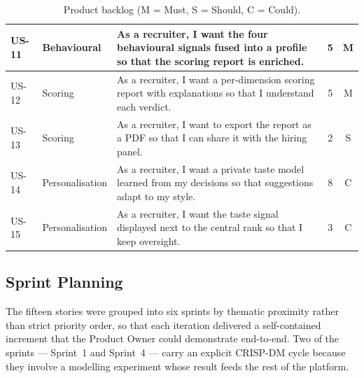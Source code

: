 \begin{table}[!htbp]
{{\begin{tabular}{|l|l|p{9.5cm}|c|c|}
        US-11 & Behavioural  & As a recruiter, I want the four behavioural signals fused into a profile so that the scoring report is enriched.                         & 5 & M \\
        \hline
        US-12 & Scoring      & As a recruiter, I want a per-dimension scoring report with explanations so that I understand each verdict.                               & 5 & M \\
        US-13 & Scoring      & As a recruiter, I want to export the report as a PDF so that I can share it with the hiring panel.                                       & 2 & S \\
        \hline
        US-14 & Personalisation & As a recruiter, I want a private taste model learned from my decisions so that suggestions adapt to my style.                         & 8 & C \\
        US-15 & Personalisation & As a recruiter, I want the taste signal displayed next to the central rank so that I keep oversight.                                  & 3 & C \\
        \hline
    \end{tabular}%
    }}
    \caption{Product backlog (M = Must, S = Should, C = Could).}
    \label{tab:backlog}
\end{table}

\subsection{Sprint Planning}

The fifteen stories were grouped into six sprints by thematic
proximity rather than strict priority order, so that each iteration
delivered a self-contained increment that the Product Owner could
demonstrate end-to-end. Two of the sprints --- Sprint~1 and Sprint~4
--- carry an explicit \acs{CRISP-DM} cycle because they involve a
modelling experiment whose result feeds the rest of the platform.

